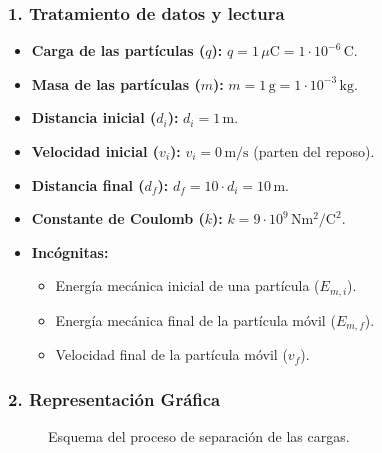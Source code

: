 \subsubsection*{1. Tratamiento de datos y lectura}
\begin{itemize}
    \item \textbf{Carga de las partículas ($q$):} $q = 1 \, \mu\text{C} = 1 \cdot 10^{-6} \, \text{C}$.
    \item \textbf{Masa de las partículas ($m$):} $m = 1 \, \text{g} = 1 \cdot 10^{-3} \, \text{kg}$.
    \item \textbf{Distancia inicial ($d_i$):} $d_i = 1 \, \text{m}$.
    \item \textbf{Velocidad inicial ($v_i$):} $v_i = 0 \, \text{m/s}$ (parten del reposo).
    \item \textbf{Distancia final ($d_f$):} $d_f = 10 \cdot d_i = 10 \, \text{m}$.
    \item \textbf{Constante de Coulomb ($k$):} $k=9\cdot10^{9} \, \text{N}\text{m}^2/\text{C}^2$.
    \item \textbf{Incógnitas:}
    \begin{itemize}
        \item Energía mecánica inicial de una partícula ($E_{m,i}$).
        \item Energía mecánica final de la partícula móvil ($E_{m,f}$).
        \item Velocidad final de la partícula móvil ($v_f$).
    \end{itemize}
\end{itemize}

\subsubsection*{2. Representación Gráfica}
\begin{figure}[H]
    \centering
    \caption{Esquema del proceso de separación de las cargas.}
\end{figure}

